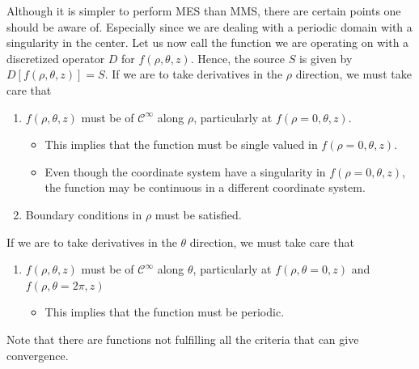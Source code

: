 Although it is simpler to perform MES than MMS, there are certain points one should be aware of.
Especially since we are dealing with a periodic domain with a singularity in the center.
Let us now call the function we are operating on with a discretized operator $D$ for $f(\rho,\theta,z)$.
Hence, the source $S$ is given by $D[f(\rho,\theta,z)]=S$.
If we are to take derivatives in the $\rho$ direction, we must take care that
%
\vspace{0.5cm}
\begin{enumerate}
    \item $f(\rho,\theta,z)$ must be of $\mathcal{C}^\infty$ along $\rho$, particularly at $f(\rho=0,\theta,z)$.%
    \begin{itemize}[noitemsep,nolistsep]
            \item This implies that the function must be single valued in $f(\rho=0,\theta,z)$.
            \item Even though the coordinate system have a singularity in $f(\rho=0,\theta,z)$, the function may be continuous in a different coordinate system.
    \end{itemize}
  \item Boundary conditions in $\rho$ must be satisfied.
\end{enumerate}
\vspace{0.5cm}
%
If we are to take derivatives in the $\theta$ direction, we must take care that
%
\vspace{0.5cm}
\begin{enumerate}
    \item $f(\rho,\theta,z)$ must be of $\mathcal{C}^\infty$ along $\theta$, particularly at $f(\rho,\theta=0,z)$ and $f(\rho,\theta=2\pi,z)$%
    \begin{itemize}[noitemsep,nolistsep]
        \item This implies that the function must be periodic.
    \end{itemize}
\end{enumerate}
\vspace{0.5cm}
%
Note that there are functions not fulfilling all the criteria that can give convergence.

